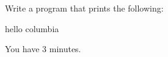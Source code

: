 Write a program that prints the following:
\begin{console}
hello columbia
\end{console}
You have 3 minutes.
